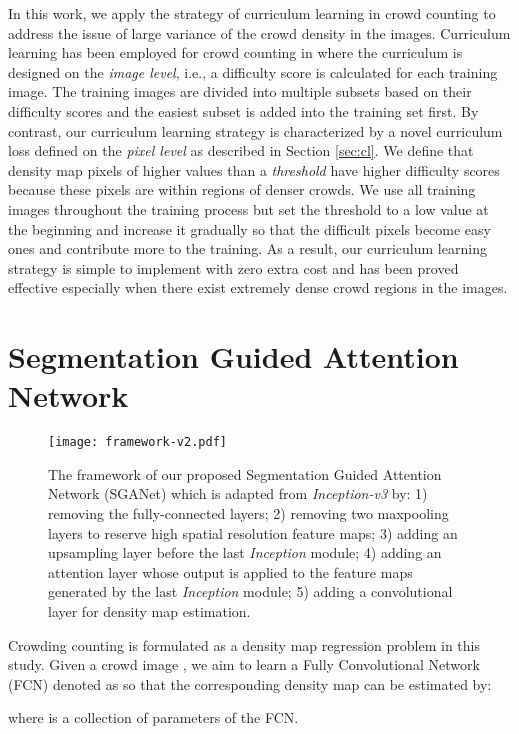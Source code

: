 \documentclass[journal,comsoc]{IEEEtran}
\begin{document}
In this work, we apply the strategy of curriculum learning in crowd counting to address the issue of large variance of the crowd density in the images. Curriculum learning has been employed for crowd counting in \cite{liu2019point} where the curriculum is designed on the \textit{image level}, i.e., a difficulty score is calculated for each training image. The training images are divided into multiple subsets based on their difficulty scores and the easiest subset is added into the training set first. By contrast, our curriculum learning strategy is characterized by a novel curriculum loss defined on the \textit{pixel level} as described in Section \ref{sec:cl}. We define that density map pixels of higher values than a \textit{threshold} have higher difficulty scores because these pixels are within regions of denser crowds. We use all training images throughout the training process but set the threshold to a low value at the beginning and increase it gradually so that the difficult pixels become easy ones and contribute more to the training. 
As a result, our curriculum learning strategy is simple to implement with zero extra cost and has been proved effective especially when there exist extremely dense crowd regions in the images.

\section{Segmentation Guided Attention Network}\label{sec:sganet}
\begin{figure*}
    \centering
    \texttt{[image: framework-v2.pdf]}
    \caption{The framework of our proposed Segmentation Guided Attention Network (SGANet) which is adapted from \textit{Inception-v3} by: 1) removing the fully-connected layers; 2) removing two maxpooling layers to reserve high spatial resolution feature maps; 3) adding an upsampling layer before the last \textit{Inception} module; 4) adding an attention layer whose output is applied to the feature maps generated by the last \textit{Inception} module; 5) adding a convolutional layer for density map estimation.}
    \label{fig:framework}
\end{figure*}

Crowding counting is formulated as a density map regression problem in this study. Given a crowd image , we aim to learn a Fully Convolutional Network (FCN) denoted as  so that the corresponding density map  can be estimated by:

where  is a collection of parameters of the FCN.
\end{document}
